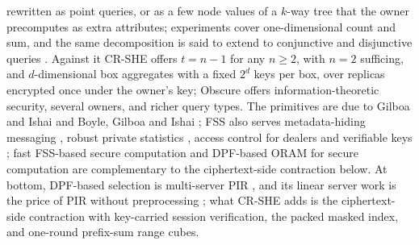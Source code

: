 \documentclass[a4paper,fleqn]{cas-sc}
\begin{document}
rewritten as point queries, or as a few node values of a $k$-way tree that the
owner precomputes as extra attributes; experiments cover one-dimensional count
and sum, and the same decomposition is said to extend to conjunctive and
disjunctive queries \citep[\S8.3, \S9]{gupta2020obscure}. Against it CR-SHE
offers $t=n-1$ for any $n\ge2$, with $n=2$ sufficing, and $d$-dimensional box
aggregates with a fixed $2^d$ keys per box, over replicas encrypted once under
the owner's key; Obscure offers information-theoretic security, several
owners, and richer query types. The primitives are due to Gilboa and Ishai
\citep{gilboa2014distributed} and Boyle, Gilboa and Ishai
\citep{boyle2015function,boyle2016function}; FSS also serves metadata-hiding
messaging \citep{express}, robust private statistics
\citep{corrigan2017prio,boneh2021lightweight}, access control for dealers
\citep{pacl} and verifiable keys \citep{decastro2022lightweight}; fast
FSS-based secure computation \citep{storrier2023grotto} and DPF-based ORAM for
secure computation \citep{doerner2017scaling} are complementary to the
ciphertext-side contraction below. At bottom, DPF-based selection is
multi-server PIR \citep{chor1998private}, and its linear server work is the
price of PIR without preprocessing \citep{beimel2000reducing}; what CR-SHE adds
is the ciphertext-side contraction with key-carried session verification, the
packed masked index, and one-round prefix-sum range cubes.
\end{document}
